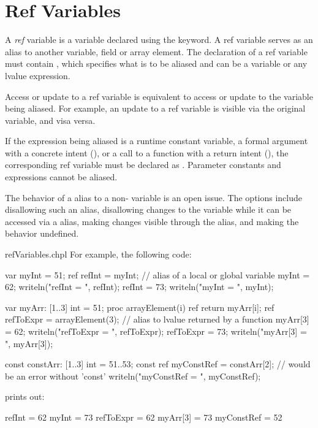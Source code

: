 \section{Ref Variables}
\label{Ref_Variables}

A \emph{ref} variable is a variable declared using the  keyword.
A ref variable serves as an alias to another variable, field or array element.
The declaration of a ref variable must contain ,
which specifies what is to be aliased and can be a variable
or any lvalue expression.

Access or update to a ref variable is equivalent to access or update
to the variable being aliased. For example, an update to a ref variable
is visible via the original variable, and visa versa.

If the expression being aliased is a runtime constant variable,
a formal argument with a  concrete intent
(), or a call to a function with a 
return intent (), the corresponding
ref variable must be declared as .
Parameter constants and expressions cannot be aliased.

\begin{openissue}
The behavior of a  alias to a non- variable
is an open issue. The options include disallowing such an alias,
disallowing changes to the variable while it can be accessed via
a  alias, making changes visible through the alias,
and making the behavior undefined.
\end{openissue}

\begin{chapelexample}{refVariables.chpl}
For example, the following code:

\begin{chapel}
var myInt = 51;
ref refInt = myInt;                   // alias of a local or global variable
myInt = 62;
writeln("refInt = ", refInt);
refInt = 73;
writeln("myInt = ", myInt);

var myArr: [1..3] int = 51;
proc arrayElement(i) ref  return myArr[i];
ref refToExpr = arrayElement(3);      // alias to lvalue returned by a function
myArr[3] = 62;
writeln("refToExpr = ", refToExpr);
refToExpr = 73;
writeln("myArr[3] = ", myArr[3]);

const constArr: [1..3] int = 51..53;
const ref myConstRef = constArr[2];   // would be an error without 'const'
writeln("myConstRef = ", myConstRef);
\end{chapel}

prints out:

\begin{chapelprintoutput}{}
refInt = 62
myInt = 73
refToExpr = 62
myArr[3] = 73
myConstRef = 52
\end{chapelprintoutput}
\end{chapelexample}
